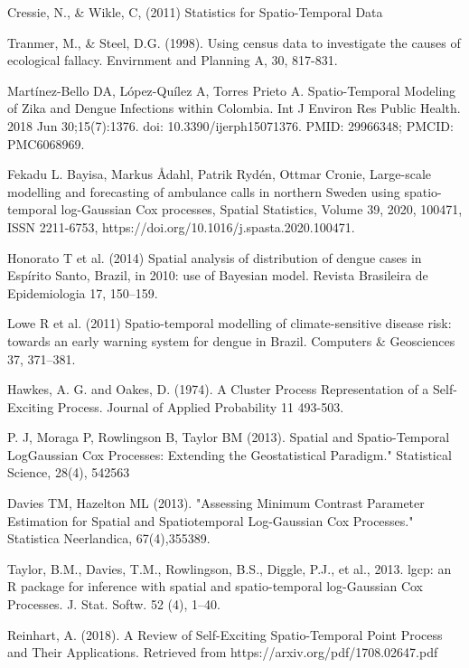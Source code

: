 \documentclass[a4paper]{thesis}
\begin{document}
\begin{thebibliography}{99}
 Cressie, N., \& Wikle, C, (2011) Statistics for Spatio-Temporal Data

 Tranmer, M., \& Steel, D.G. (1998). Using census data to investigate the causes of ecological fallacy. Envirnment and Planning A, 30, 817-831.

 Martínez-Bello DA, López-Quílez A, Torres Prieto A. Spatio-Temporal Modeling of Zika and Dengue Infections within Colombia. Int J Environ Res Public Health. 2018 Jun 30;15(7):1376. doi: 10.3390/ijerph15071376. PMID: 29966348; PMCID: PMC6068969.

 Fekadu L. Bayisa, Markus Ådahl, Patrik Rydén, Ottmar Cronie, Large-scale modelling and forecasting of ambulance calls in northern Sweden using spatio-temporal log-Gaussian Cox processes,
Spatial Statistics,
Volume 39, 2020, 100471, ISSN 2211-6753, https://doi.org/10.1016/j.spasta.2020.100471.

 Honorato T et al. (2014) Spatial analysis of distribution of dengue cases in Espírito Santo, Brazil, in 2010: use of Bayesian model. Revista Brasileira de Epidemiologia 17, 150–159.

 Lowe R et al. (2011) Spatio-temporal modelling of climate-sensitive disease risk: towards an early warning system for dengue in Brazil. Computers \& Geosciences 37, 371–381.

 Hawkes, A. G. and Oakes, D. (1974). A Cluster Process Representation of a Self-Exciting Process. Journal of Applied Probability 11 493-503.

 P. J, Moraga P, Rowlingson B, Taylor BM (2013). Spatial and Spatio-Temporal LogGaussian
Cox Processes: Extending the Geostatistical Paradigm." Statistical Science, 28(4), 542{563}

 Davies TM, Hazelton ML (2013). "Assessing Minimum Contrast Parameter Estimation for
Spatial and Spatiotemporal Log-Gaussian Cox Processes." Statistica Neerlandica, 67(4),355{389}.

 Taylor, B.M., Davies, T.M., Rowlingson, B.S., Diggle, P.J., et al., 2013. lgcp: an R package for inference with spatial and
spatio-temporal log-Gaussian Cox Processes. J. Stat. Softw. 52 (4), 1–40.

 Reinhart, A. (2018). A Review of Self-Exciting Spatio-Temporal Point Process and Their Applications. Retrieved from https://arxiv.org/pdf/1708.02647.pdf


\end{thebibliography}
\end{document}
